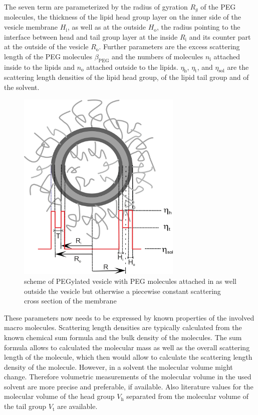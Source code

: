 The seven term are parameterized by the radius of gyration $R_g$ of the PEG molecules, the thickness of the lipid head group layer on the inner side of the vesicle membrane $H_\mathrm{i}$, as well as at the outside $H_\mathrm{o}$, the radius pointing to the interface between head and tail group layer at the inside $R_\mathrm{i}$ and its counter part at the outside of the vesicle $R_\mathrm{o}$. Further parameters are the excess scattering length of the PEG molecules $\beta_\mathrm{PEG}$ and the numbers of molecules $n_\mathrm{i}$ attached inside to the lipids and $n_\mathrm{o}$ attached outside to the lipids. $\eta_\mathrm{h}$, $\eta_\mathrm{t}$, and $\eta_\mathrm{sol}$ are the scattering length densities of the lipid head group, of the lipid tail group and of the solvent.

\begin{figure}[htb]
\begin{center}
\includegraphics[width=0.7\textwidth]{../images/form_factor/vesicles/vesiclePEGpiecewconst.png}
\end{center}
\caption{scheme of PEGylated vesicle with PEG molecules attached in as well outside the vesicle but otherwise a piecewise constant scattering cross section of the membrane}
\label{fig:vesiclePEGpiecewconst}
\end{figure}

These parameters now needs to be expressed by known properties of the involved macro molecules. Scattering length densities are typically calculated from the known chemical sum formula and the bulk density of the molecules. The sum formula allows to calculated the molecular mass as well as the overall scattering length of the molecule, which then would allow to calculate the scattering length density of the molecule. However, in a solvent the molecular volume might change. Therefore volumetric measurements of the molecular volume in the used solvent are more precise and preferable, if available. Also literature values for the molecular volume of the head group $V_\mathrm{h}$ separated from the molecular volume of the tail group $V_\mathrm{t}$ are available.

